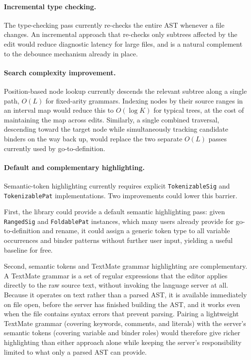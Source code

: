\paragraph{Incremental type checking.}
The type-checking pass currently re-checks the entire AST whenever a file changes.
An incremental approach that re-checks only subtrees affected by the edit would reduce diagnostic latency for large files, and is a natural complement to the debounce mechanism already in place.

\paragraph{Search complexity improvement.}
Position-based node lookup currently descends the relevant subtree along a single path, $O(L)$ for fixed-arity grammars.
Indexing nodes by their source ranges in an interval map would reduce this to $O(\log K)$ for typical trees, at the cost of maintaining the map across edits.
Similarly, a single combined traversal, descending toward the target node while simultaneously tracking candidate binders on the way back up, would replace the two separate $O(L)$ passes currently used by go-to-definition.

\paragraph{Default and complementary highlighting.}
Semantic-token highlighting currently requires explicit \texttt{TokenizableSig} and \texttt{TokenizablePat} implementations.
Two improvements could lower this barrier.

First, the library could provide a default semantic highlighting pass: given \texttt{RangedSig} and \texttt{FoldablePat} instances, which many users already provide for go-to-definition and rename, it could assign a generic token type to all variable occurrences and binder patterns without further user input, yielding a useful baseline for free.

Second, semantic tokens and TextMate grammar highlighting are complementary.
A TextMate grammar is a set of regular expressions that the editor applies directly to the raw source text, without invoking the language server at all.
Because it operates on text rather than a parsed AST, it is available immediately on file open, before the server has finished building the AST, and it works even when the file contains syntax errors that prevent parsing.
Pairing a lightweight TextMate grammar (covering keywords, comments, and literals) with the server's semantic tokens (covering variable and binder roles) would therefore give richer highlighting than either approach alone while keeping the server's responsibility limited to what only a parsed AST can provide.

